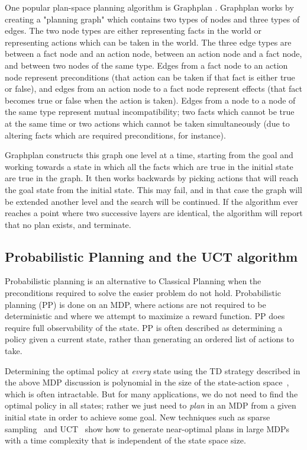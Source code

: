 One popular plan-space planning algorithm is Graphplan \cite{graphplan}.  Graphplan works by creating
a "planning graph" which contains two types of nodes and three types of edges.  The two node types are
either representing facts in the world or representing actions which can be taken in the world.  The three edge
types are between a fact node and an action node, between an action node and a fact node, and between two
nodes of the same type.  Edges from a fact node to an action node represent preconditions (that action can be
taken if that fact is either true or false), and edges from an action node to a fact node represent effects (that
fact becomes true or false when the action is taken).  Edges from a node to a node of the same type represent
mutual incompatibility; two facts which cannot be true at the same time or two actions which cannot be taken
simultaneously (due to altering facts which are required preconditions, for instance).

Graphplan constructs this graph one level at a time, starting from the goal and working towards a state in which
all the facts which are true in the initial state are true in the graph.  It then works backwards by picking actions
that will reach the goal state from the initial state.  This may fail, and in that case the graph will be extended
another level and the search will be continued.  If the algorithm ever reaches a point where two successive
layers are identical, the algorithm will report that no plan exists, and terminate.



\subsection{Probabilistic Planning and the UCT algorithm}

Probabilistic planning is an alternative to Classical Planning when the preconditions required to solve the
easier problem do not hold.  Probabilistic planning (PP) is done on an MDP, where actions are not required
to be deterministic and where we attempt to maximize a reward function.  PP does require
full observability of the state.  PP is often described
as determining a policy given a current state, rather than generating an ordered list of actions to take.

Determining the optimal policy at {\em every} state using the TD
strategy described in the above MDP discussion is polynomial in the size of the state-action
space~\cite{brafman_2003_rmax}, which is often intractable.
But for many applications, we do not
need to find the optimal policy in all states; rather we just need to {\em plan} in
an MDP from a given initial state in order to achieve some goal. New techniques such
as sparse sampling~\cite{kearns_1999_sparse} and
UCT~\cite{kocsis_bandit_2006} show how to generate near-optimal plans
in large MDPs with a time complexity that is independent of the state
space size.

